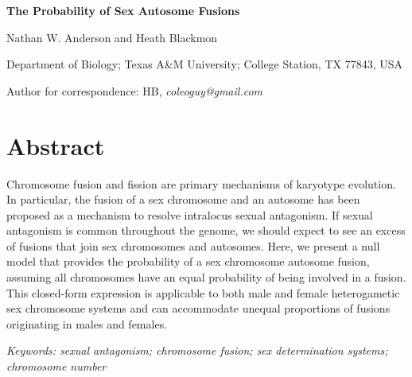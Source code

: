 \documentclass[12pt]{article}
\begin{document}


\begin{center}
\textbf{The Probability of Sex Autosome Fusions}

Nathan W. Anderson and Heath Blackmon
\end{center}

\noindent
Department of Biology; Texas A\&M University; College Station, TX 77843, USA

\noindent
Author for correspondence: HB, \textit{coleoguy@gmail.com}







\section{Abstract}

Chromosome fusion and fission are primary mechanisms of karyotype evolution. 
In particular, the fusion of a sex chromosome and an autosome has been proposed as a mechanism to resolve intralocus sexual antagonism.
If sexual antagonism is common throughout the genome, we should expect to see an excess of fusions that join sex chromosomes and autosomes.
Here, we present a null model that provides the probability of a sex chromosome autosome fusion, assuming all chromosomes have an equal probability of being involved in a fusion.
This closed-form expression is applicable to both male and female heterogametic sex chromosome systems and can accommodate unequal proportions of fusions originating in males and females.


\bigskip
\noindent
\textit{Keywords: sexual antagonism; chromosome fusion; sex determination systems; chromosome number}


\clearpage



\linenumbers
\end{document}
